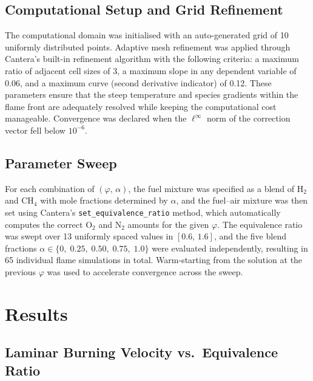 \documentclass[12pt,a4paper]{article}
\newcommand{\phisym}{\varphi}
\newcommand{\alphasym}{\alpha}
\begin{document}
\subsection{Computational Setup and Grid Refinement}

The computational domain was initialised with an auto-generated grid of 10 uniformly distributed points. Adaptive mesh refinement was applied through Cantera's built-in refinement algorithm with the following criteria: a maximum ratio of adjacent cell sizes of 3, a maximum slope in any dependent variable of 0.06, and a maximum curve (second derivative indicator) of 0.12. These parameters ensure that the steep temperature and species gradients within the flame front are adequately resolved while keeping the computational cost manageable. Convergence was declared when the \(\ell^\infty\) norm of the correction vector fell below \(10^{-6}\).

\subsection{Parameter Sweep}

For each combination of \((\phisym,\,\alphasym)\), the fuel mixture was specified as a blend of \(\mathrm{H_2}\) and \(\mathrm{CH_4}\) with mole fractions determined by \(\alphasym\), and the fuel--air mixture was then set using Cantera's \texttt{set\_equivalence\_ratio} method, which automatically computes the correct \(\mathrm{O_2}\) and \(\mathrm{N_2}\) amounts for the given \(\phisym\). The equivalence ratio was swept over 13 uniformly spaced values in \([0.6,\,1.6]\), and the five blend fractions \(\alphasym \in \{0,\;0.25,\;0.50,\;0.75,\;1.0\}\) were evaluated independently, resulting in 65 individual flame simulations in total. Warm-starting from the solution at the previous \(\phisym\) was used to accelerate convergence across the sweep.

\section{Results}
\label{sec:results}

\subsection{Laminar Burning Velocity vs.\ Equivalence Ratio}
\end{document}
